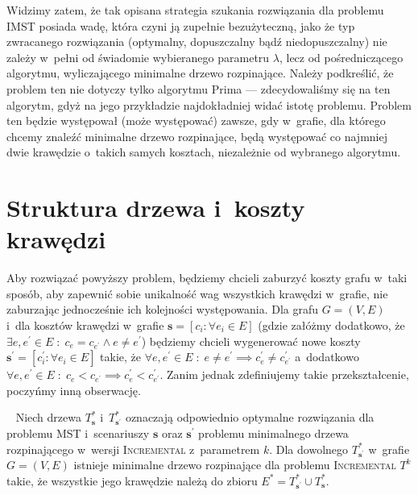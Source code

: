 Widzimy zatem, że tak opisana strategia szukania rozwiązania dla problemu \textsc{IMST} posiada wadę, która czyni ją zupełnie bezużyteczną, jako że typ zwracanego rozwiązania (optymalny, dopuszczalny bądź niedopuszczalny) nie zależy w~pełni od świadomie wybieranego parametru $\lambda$, lecz od pośredniczącego algorytmu, wyliczającego minimalne drzewo rozpinające.
Należy podkreślić, że problem ten nie dotyczy tylko algorytmu Prima --- zdecydowaliśmy się na ten algorytm, gdyż na jego przykładzie najdokładniej widać istotę problemu.
Problem ten będzie występował (może występować) zawsze, gdy w~grafie, dla którego chcemy znaleźć minimalne drzewo rozpinające, będą występować co najmniej dwie krawędzie o~takich samych kosztach, niezależnie od wybranego algorytmu.




\section{Struktura drzewa i~koszty krawędzi}




Aby rozwiązać powyższy problem, będziemy chcieli zaburzyć koszty grafu w~taki sposób, aby zapewnić sobie unikalność wag wszystkich krawędzi w~grafie, nie zaburzając jednocześnie ich kolejności występowania.
Dla grafu $G = \left( V, E \right)$ i~dla kosztów krawędzi w~grafie $\textbf{s} = \left[ c_{i} : \forall e_{i} \in E \right]$ (gdzie załóżmy dodatkowo, że $\exists e, e^{\prime} \in E \; : \; c_{e} = c_{e^{\prime}} \wedge e \neq e^{\prime}$) będziemy chcieli wygenerować nowe koszty $\textbf{s}^{\prime} = \left[ c^{\prime}_{i} : \forall e_{i} \in E \right]$ takie, że $\forall e, e^{\prime} \in E \; : \; e \neq e^{\prime} \implies c^{\prime}_{e} \neq c^{\prime}_{e^{\prime}}$ a~dodatkowo $\forall e, e^{\prime} \in E \; : \; c_{e} < c_{e^{\prime}} \implies c^{\prime}_{e} < c^{\prime}_{e^{\prime}}$.
Zanim jednak zdefiniujemy takie przekształcenie, poczyńmy inną obserwację.

\begin{lemma}~\cite{incNetOpt}\label{lm:shrunkenGraph}
	Niech drzewa $T^{\ast}_{\textbf{s}}$ i~$T^{\ast}_{\textbf{s}^{\prime}}$ oznaczają odpowiednio optymalne rozwiązania dla problemu \textsc{MST} i~scenariuszy $\textbf{s}$ oraz $\textbf{s}^{\prime}$ problemu minimalnego drzewa rozpinającego w~wersji \textsc{Incremental} z~parametrem $k$.
	Dla dowolnego $T^{\ast}_{\textbf{s}^{\prime}}$ w~grafie $G = \left( V, E \right)$ istnieje minimalne drzewo rozpinające dla problemu \textsc{Incremental} $T^{k}$ takie, że wszystkie jego krawędzie należą do zbioru $E^{\ast} = T^{\ast}_{\textbf{s}^{\prime}} \cup T^{\ast}_{\textbf{s}}$.
\end{lemma}

